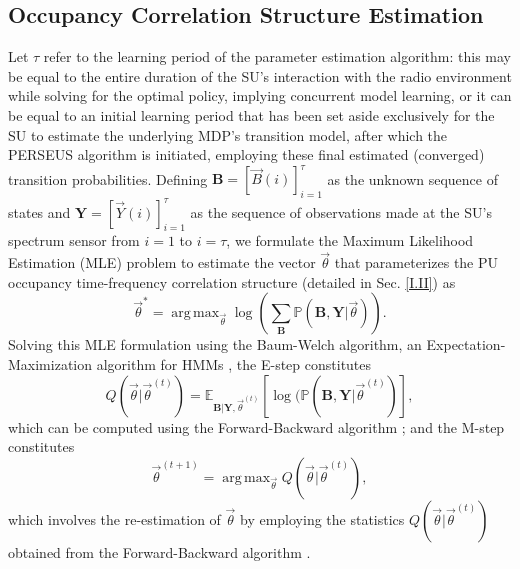 \documentclass[12pt, draftcls, onecolumn]{IEEEtran}
\DeclareMathOperator*{\argmax}{arg\,max}
\begin{document}
\subsection{Occupancy Correlation Structure Estimation}\label{II.I}
Let $\tau$ refer to the learning period of the parameter estimation algorithm: this may be equal to the entire duration of the SU's interaction with the radio environment while solving for the optimal policy, implying concurrent model learning, or it can  be equal to an initial learning period that has been set aside exclusively for the SU to estimate the underlying MDP's transition model, after which the PERSEUS algorithm is initiated, employing these final estimated (converged) transition probabilities. Defining $\mathbf{B}{=}[\vec{B}(i)]_{i{=}1}^{\tau}$ as the unknown sequence of states and $\mathbf{Y}{=}[\vec{Y}(i)]_{i{=}1}^{\tau}$ as the sequence of observations made at the SU's spectrum sensor from $i{=}1$ to $i{=}\tau$, we formulate the Maximum Likelihood Estimation (MLE) problem to estimate the vector $\vec{\theta}$ that parameterizes the PU occupancy time-frequency correlation structure (detailed in Sec. \ref{I.II}) as
\begin{equation}\label{19}
    \vec{\theta}^{*}=\argmax_{\vec{\theta}}\log{\left(\sum_{\mathbf{B}}\mathbb{P}(\mathbf{B},\mathbf{Y}|\vec{\theta})\right)}.
\end{equation}
Solving this MLE formulation using the Baum-Welch algorithm, an Expectation-Maximization algorithm for HMMs \cite{Baum_1966}, the E-step constitutes
\begin{equation}\label{20}
    Q(\vec{\theta}|\vec{\theta}^{(t)})=\mathbb{E}_{\mathbf{B}|\mathbf{Y},\vec{\theta}^{(t)}}\left[\log{(\mathbb{P}(\mathbf{B},\mathbf{Y}|\vec{\theta}^{(t)})}\right],
\end{equation}
which can be computed using the Forward-Backward algorithm \cite{Rabiner_1989}; and the M-step constitutes
\begin{equation}\label{21}
    \vec{\theta}^{(t+1)}=\argmax_{\vec{\theta}}Q(\vec{\theta}|\vec{\theta}^{(t)}),
\end{equation}
which involves the re-estimation of $\vec{\theta}$ by employing the statistics $Q(\vec{\theta}|\vec{\theta}^{(t)})$ obtained from the Forward-Backward algorithm \cite{Rabiner_1989}.
\end{document}
